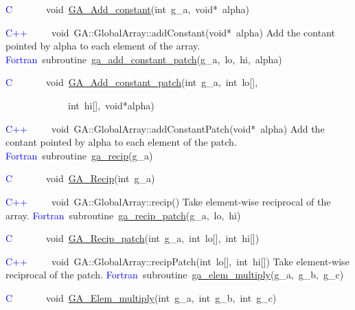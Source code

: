 \textcolor{blue}{C}~~~~~~~void~\href{http://www.emsl.pnl.gov/docs/global/c_nga_ops.html\#ga_add_constant}{GA\_{}Add\_{}constant}(int~g\_a,~void{*}~alpha)~

\textcolor{blue}{C++}~~~~~void~GA::GlobalArray::addConstant(void{*}~alpha)
Add the contant pointed by alpha to each element of the array. 
\textcolor{blue}{Fortran}~subroutine~\href{http://www.emsl.pnl.gov/docs/global/ga_ops.html\#ga_add_constant_patch}{ga\_{}add\_{}constant\_{}patch}(g\_a,~lo,~hi,~alpha)~

\textcolor{blue}{C}~~~~~~~void~\href{http://www.emsl.pnl.gov/docs/global/c_nga_ops.html\#ga_add_constant_patch}{GA\_{}Add\_{}constant\_{}patch}(int~g\_a,~int~lo{[}{]},~

~~~~~~~~~~~~~int~hi{[}{]},~void{*}alpha)~

\textcolor{blue}{C++}~~~~~void~GA::GlobalArray::addConstantPatch(void{*}~alpha)
Add the contant pointed by alpha to each element of the patch. 
\textcolor{blue}{Fortran~}subroutine~\href{http://www.emsl.pnl.gov/docs/global/ga_ops.html\#ga_recip}{ga\_{}recip}(g\_a)

\textcolor{blue}{C}~~~~~~~void~\href{http://www.emsl.pnl.gov/docs/global/c_nga_ops.html\#ga_recip}{GA\_{}Recip}(int~g\_a)

\textcolor{blue}{C++}~~~~~void~GA::GlobalArray::recip()
Take element-wise reciprocal of the array.
\textcolor{blue}{Fortran}~subroutine~\href{http://www.emsl.pnl.gov/docs/global/ga_ops.html\#ga_recip_patch}{ga\_{}recip\_{}patch}(g\_a,~lo,~hi)~

\textcolor{blue}{C}~~~~~~~void~\href{http://www.emsl.pnl.gov/docs/global/c_nga_ops.html\#ga_recip_patch}{GA\_{}Recip\_{}patch}(int~g\_a,~int~lo{[}{]},~int~hi{[}{]})

\textcolor{blue}{C++~}~~~~void~GA::GlobalArray::recipPatch(int~lo{[}{]},~int~hi{[}{]})
Take element-wise reciprocal of the patch.
\textcolor{blue}{Fortran}~subroutine~\href{http://www.emsl.pnl.gov/docs/global/ga_ops.html\#ga_elem_multiply}{ga\_{}elem\_{}multiply}(g\_a,~g\_b,~g\_c)

\textcolor{blue}{C}~~~~~~~void~\href{http://www.emsl.pnl.gov/docs/global/c_nga_ops.html\#ga_elem_multiply}{GA\_{}Elem\_{}multiply}(int~g\_a,~int~g\_b,~int~g\_c)~

